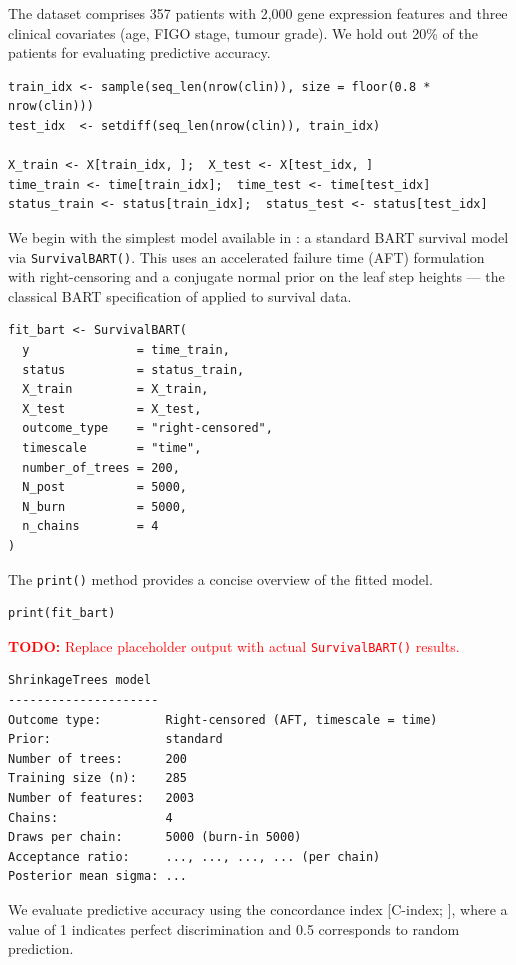 The dataset comprises 357 patients with 2,000 gene expression features and three clinical covariates (age, FIGO stage, tumour grade). We hold out 20\% of the patients for evaluating predictive accuracy.

\begin{verbatim}
train_idx <- sample(seq_len(nrow(clin)), size = floor(0.8 * nrow(clin)))
test_idx  <- setdiff(seq_len(nrow(clin)), train_idx)

X_train <- X[train_idx, ];  X_test <- X[test_idx, ]
time_train <- time[train_idx];  time_test <- time[test_idx]
status_train <- status[train_idx];  status_test <- status[test_idx]
\end{verbatim}

We begin with the simplest model available in : a standard BART survival model via \texttt{SurvivalBART()}. This uses an accelerated failure time (AFT) formulation with right-censoring and a conjugate normal prior on the leaf step heights --- the classical BART specification of \citet{chipman2010bart} applied to survival data.

\begin{verbatim}
fit_bart <- SurvivalBART(
  y               = time_train,
  status          = status_train,
  X_train         = X_train,
  X_test          = X_test,
  outcome_type    = "right-censored",
  timescale       = "time",
  number_of_trees = 200,
  N_post          = 5000,
  N_burn          = 5000,
  n_chains        = 4
)
\end{verbatim}

The \texttt{print()} method provides a concise overview of the fitted model.

\begin{verbatim}
print(fit_bart)
\end{verbatim}

\textcolor{red}{\textbf{TODO:} Replace placeholder output with actual \texttt{SurvivalBART()} results.}

\begin{verbatim}
ShrinkageTrees model
---------------------
Outcome type:         Right-censored (AFT, timescale = time)
Prior:                standard
Number of trees:      200
Training size (n):    285
Number of features:   2003
Chains:               4
Draws per chain:      5000 (burn-in 5000)
Acceptance ratio:     ..., ..., ..., ... (per chain)
Posterior mean sigma: ...
\end{verbatim}

We evaluate predictive accuracy using the concordance index {[}C-index; \citet{harrell1996concordance}{]}, where a value of 1 indicates perfect discrimination and 0.5 corresponds to random prediction.

